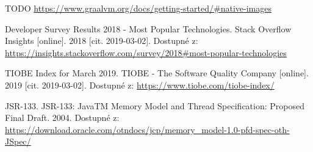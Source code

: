 \begin{literatura}{99}

    TODO \url{https://www.graalvm.org/docs/getting-started/#native-images}

	Developer Survey Results 2018 - Most Popular Technologies. Stack Overflow Insights [online]. 2018 [cit. 2019-03-02]. Dostupné z: \url{https://insights.stackoverflow.com/survey/2018#most-popular-technologies}

    TIOBE Index for March 2019. TIOBE - The Software Quality Company [online]. 2019 [cit. 2019-03-02]. Dostupné z: \url{https://www.tiobe.com/tiobe-index/}

    JSR-133. JSR-133: JavaTM Memory Model and Thread Specification: Proposed Final Draft. 2004. Dostupné z: \url{https://download.oracle.com/otndocs/jcp/memory_model-1.0-pfd-spec-oth-JSpec/}
    

\end{literatura}